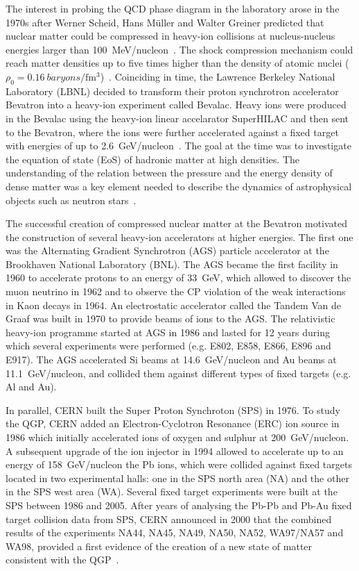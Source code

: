 The interest in probing the QCD phase diagram in the laboratory arose in the 1970s after Werner Scheid, Hans M{\"u}ller and Walter Greiner predicted that nuclear matter could be compressed in heavy-ion collisions at nucleus-nucleus energies larger than 100~\si{\MeV}/nucleon~\cite{MatterShock}. The shock compression mechanism could reach matter densities up to five times higher than the density of atomic nuclei ($\rho_{0}=0.16~baryons/\si{\femto\meter\cubed}$)~\cite{MatterShock}. Coinciding in time, the Lawrence Berkeley National Laboratory (LBNL) decided to transform their proton synchrotron accelerator Bevatron into a heavy-ion experiment called Bevalac. Heavy ions were produced in the Bevalac using the heavy-ion linear accelarator SuperHILAC and then sent to the Bevatron, where the ions were further accelerated against a fixed target with energies of up to \SI{2.6}{\GeV}/nucleon~\cite{Bevalac}. The goal at the time was to investigate the equation of state (EoS) of hadronic matter at high densities. The understanding of the relation between the pressure and the energy density of dense matter was a key element needed to describe the dynamics of astrophysical objects such as neutron stars~\cite{NeutronStar, DenseMatter}.

The successful creation of compressed nuclear matter at the Bevatron motivated the construction of several heavy-ion accelerators at higher energies. The first one was the Alternating Gradient Synchrotron (AGS) particle accelerator at the Brookhaven National Laboratory (BNL). The AGS became the first facility in 1960 to accelerate protons to an energy of \SI{33}{\GeV}, which allowed to discover the muon neutrino in 1962 and to observe the CP violation of the weak interactions in Kaon decays in 1964. An electrostatic accelerator called the Tandem Van de Graaf was built in 1970 to provide beams of ions to the AGS. The relativistic heavy-ion programme started at AGS in 1986 and lasted for 12 years during which several experiments were performed (e.g. E802, E858, E866, E896 and E917). The AGS accelerated Si beams at \SI{14.6}{\GeV}/nucleon and Au beams at \SI{11.1}{\GeV}/nucleon, and collided them against different types of fixed targets (e.g. Al and Au).

In parallel, CERN built the Super Proton Synchroton (SPS) in 1976. To study the QGP, CERN added an Electron-Cyclotron Resonance (ERC) ion source in 1986 which initially accelerated ions of oxygen and sulphur at \SI{200}{\GeV}/nucleon. A subsequent upgrade of the ion injector in 1994 allowed to accelerate up to an energy of \SI{158}{\GeV}/nucleon the Pb ions, which were collided against fixed targets located in two experimental halls: one in the SPS north area (NA) and the other in the SPS west area (WA). Several fixed target experiments were built at the SPS between 1986 and 2005. After years of analysing the Pb-Pb and Pb-Au fixed target collision data from SPS, CERN announced in 2000 that the combined results of the experiments NA44, NA45, NA49, NA50, NA52, WA97/NA57 and WA98, provided a first evidence of the creation of a new state of matter consistent with the QGP~\cite{SPSQGP}.

